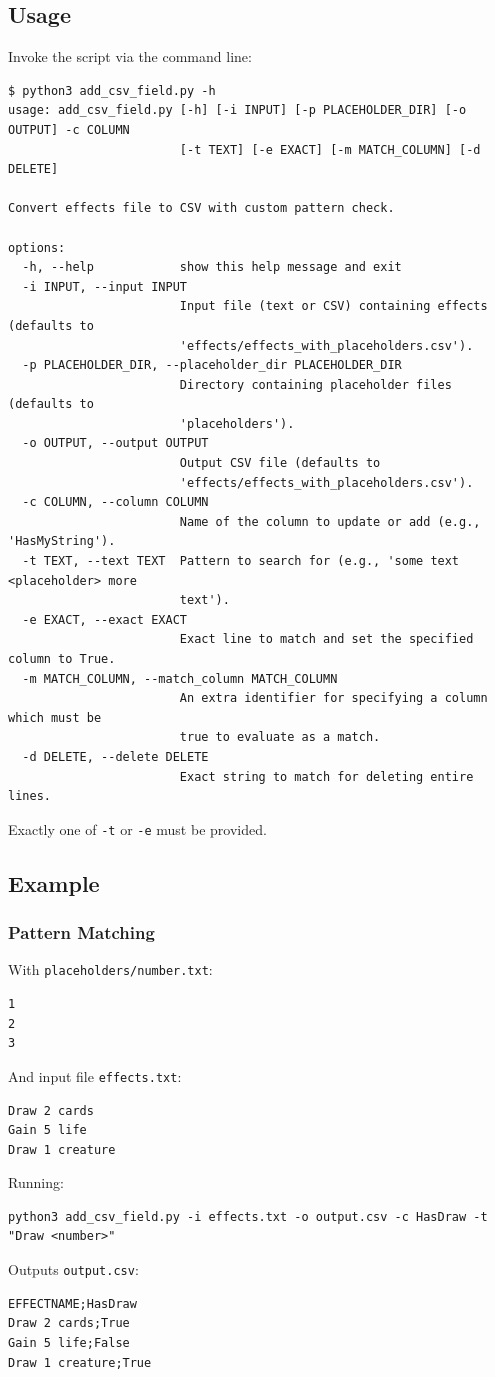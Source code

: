 \subsection{Usage}
Invoke the script via the command line:
\begin{lstlisting}[style=terminalstyle]
$ python3 add_csv_field.py -h
usage: add_csv_field.py [-h] [-i INPUT] [-p PLACEHOLDER_DIR] [-o OUTPUT] -c COLUMN
                        [-t TEXT] [-e EXACT] [-m MATCH_COLUMN] [-d DELETE]

Convert effects file to CSV with custom pattern check.

options:
  -h, --help            show this help message and exit
  -i INPUT, --input INPUT
                        Input file (text or CSV) containing effects (defaults to
                        'effects/effects_with_placeholders.csv').
  -p PLACEHOLDER_DIR, --placeholder_dir PLACEHOLDER_DIR
                        Directory containing placeholder files (defaults to
                        'placeholders').
  -o OUTPUT, --output OUTPUT
                        Output CSV file (defaults to
                        'effects/effects_with_placeholders.csv').
  -c COLUMN, --column COLUMN
                        Name of the column to update or add (e.g., 'HasMyString').
  -t TEXT, --text TEXT  Pattern to search for (e.g., 'some text <placeholder> more
                        text').
  -e EXACT, --exact EXACT
                        Exact line to match and set the specified column to True.
  -m MATCH_COLUMN, --match_column MATCH_COLUMN
                        An extra identifier for specifying a column which must be
                        true to evaluate as a match.
  -d DELETE, --delete DELETE
                        Exact string to match for deleting entire lines.

\end{lstlisting}
Exactly one of \texttt{-t} or \texttt{-e} must be provided.

\subsection{Example}
\subsubsection{Pattern Matching}
With \texttt{placeholders/number.txt}:
\begin{lstlisting}
1
2
3
\end{lstlisting}
And input file \texttt{effects.txt}:
\begin{lstlisting}
Draw 2 cards
Gain 5 life
Draw 1 creature
\end{lstlisting}
Running:
\begin{lstlisting}[style=terminalstyle]
python3 add_csv_field.py -i effects.txt -o output.csv -c HasDraw -t "Draw <number>"
\end{lstlisting}
Outputs \texttt{output.csv}:
\begin{lstlisting}
EFFECTNAME;HasDraw
Draw 2 cards;True
Gain 5 life;False
Draw 1 creature;True
\end{lstlisting}


